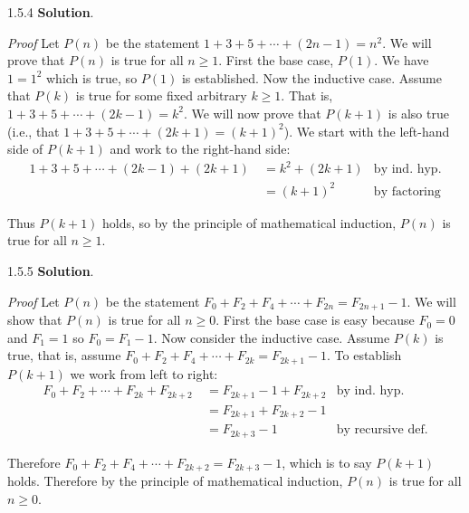 \documentclass[11pt,]{book}
\makeatletter
\theoremstyle{ptxplainnotitle}
\theoremstyle{ptxplaintitle}
\renewcommand*{\proofname}{Proof}
\renewenvironment{proof}[1][\proofname]{\par
  \pushQED{\qed}%
  \normalfont \topsep6\p@\@plus6\p@\relax
  \trivlist
  \item\relax
    {\itshape
    #1\@addpunct{.}}\hspace\labelsep\ignorespaces
}{%
  \popQED\endtrivlist\@endpefalse
}
\theoremstyle{ptxdefinitionnotitle}
\theoremstyle{ptxdefinitiontitle}
\theoremstyle{ptxdefinitionnotitle}
\theoremstyle{ptxdefinitiontitle}
\theoremstyle{ptxdefinitionnotitle}
\theoremstyle{ptxdefinitiontitle}
\theoremstyle{ptxdefinitiontitlenonumber}
\theoremstyle{ptxdefinitiontitlenonumber}
\numberwithin{equation}{chapter}
\newcommand{\amp}{&}
\makeatother
\begin{document}
\begin{divisionexercise}{1.5.4}
\textbf{Solution}.\quad%
\begin{proof}\hypertarget{proof-7}{}
\hypertarget{p-595}{}%
Let \(P(n)\) be the statement \(1+3 +5 + \cdots + (2n-1) = n^2\). We will prove that \(P(n)\) is true for all \(n \ge 1\). First the base case, \(P(1)\). We have \(1 = 1^2\) which is true, so \(P(1)\) is established. Now the inductive case. Assume that \(P(k)\) is true for some fixed arbitrary \(k \ge 1\). That is, \(1 + 3 + 5 + \cdots + (2k-1) = k^2\). We will now prove that \(P(k+1)\) is also true (i.e., that \(1 + 3 + 5 + \cdots + (2k+1) = (k+1)^2\)). We start with the left-hand side of \(P(k+1)\) and work to the right-hand side:%
\begin{align*}
1 + 3 + 5 + \cdots + (2k-1) + (2k+1) ~ \amp = k^2 + (2k+1) \amp \text{by ind. hyp.}\\
\amp = (k+1)^2 \amp \text{by factoring}
\end{align*}
%
\par
\hypertarget{p-596}{}%
Thus \(P(k+1)\) holds, so by the principle of mathematical induction, \(P(n)\) is true for all \(n \ge 1\).%
\end{proof}
\end{divisionexercise}%
\begin{divisionexercise}{1.5.5}
\textbf{Solution}.\quad%
\begin{proof}\hypertarget{proof-8}{}
\hypertarget{p-598}{}%
Let \(P(n)\) be the statement \(F_0 + F_2 + F_4 + \cdots + F_{2n} = F_{2n+1} - 1\). We will show that \(P(n)\) is true for all \(n \ge 0\). First the base case is easy because \(F_0 = 0\) and \(F_1 = 1\) so \(F_0 = F_1 - 1\). Now consider the inductive case. Assume \(P(k)\) is true, that is, assume \(F_0 + F_2 + F_4 + \cdots + F_{2k} = F_{2k+1} - 1\). To establish \(P(k+1)\) we work from left to right:%
\begin{align*}
F_0 + F_2 + \cdots + F_{2k} + F_{2k+2} ~ \amp = F_{2k+1} - 1 + F_{2k+2} \amp \text{by ind. hyp.}\\
\amp = F_{2k+1} + F_{2k+2} - 1 \amp\\
\amp = F_{2k+3} - 1 \amp \text{by recursive def.}
\end{align*}
%
\par
\hypertarget{p-599}{}%
Therefore \(F_0 + F_2 + F_4 + \cdots + F_{2k+2} = F_{2k+3} - 1\), which is to say \(P(k+1)\) holds. Therefore by the principle of mathematical induction, \(P(n)\) is true for all \(n \ge 0\).%
\end{proof}
\end{divisionexercise}%
\end{document}
